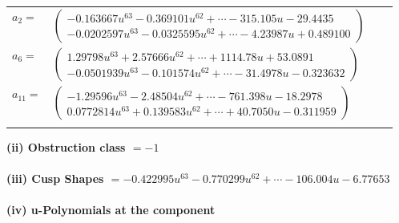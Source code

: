 \documentclass[1p]{elsarticle_modified}
\theoremstyle{definition}
\begin{document}
\begin{tabular}{m{7pt} m{180pt} m{7pt} m{180pt} }
\flushright $a_{2}=$&$\begin{pmatrix}-0.163667 u^{63}-0.369101 u^{62}+\cdots-315.105 u-29.4435\\-0.0202597 u^{63}-0.0325595 u^{62}+\cdots-4.23987 u+0.489100\end{pmatrix}$ \\
\flushright $a_{6}=$&$\begin{pmatrix}1.29798 u^{63}+2.57666 u^{62}+\cdots+1114.78 u+53.0891\\-0.0501939 u^{63}-0.101574 u^{62}+\cdots-31.4978 u-0.323632\end{pmatrix}$ \\
\flushright $a_{11}=$&$\begin{pmatrix}-1.29596 u^{63}-2.48504 u^{62}+\cdots-761.398 u-18.2978\\0.0772814 u^{63}+0.139583 u^{62}+\cdots+40.7050 u-0.311959\end{pmatrix}$\\&\end{tabular}
\flushleft \textbf{(ii) Obstruction class $= -1$}\\~\\
\flushleft \textbf{(iii) Cusp Shapes $= -0.422995 u^{63}-0.770299 u^{62}+\cdots-106.004 u-6.77653$}\\~\\
\newpage\renewcommand{\arraystretch}{1}
\flushleft \textbf{(iv) u-Polynomials at the component}\newline \\
\end{document}

